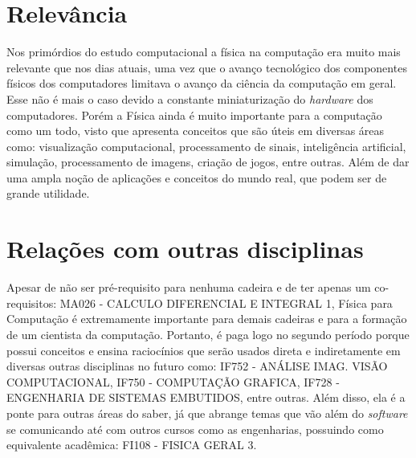 \documentclass[12pt]{article}
\begin{document}
\section{Relevância}
\par
Nos primórdios do estudo computacional a física na computação era muito mais relevante que nos dias atuais, uma vez que o avanço tecnológico dos componentes físicos dos computadores limitava o avanço da ciência da computação em geral. Esse não é mais o caso devido a constante miniaturização do \textit{hardware} dos computadores. Porém a Física ainda é muito importante para a computação como um todo, visto que apresenta conceitos que são úteis em diversas áreas como: visualização computacional, processamento de sinais, inteligência artificial, simulação, processamento de imagens, criação de jogos, entre outras. Além de dar uma ampla noção de aplicações e conceitos do mundo real, que podem ser de grande utilidade.
\cite{fonte:WIKI}
\cite{fonte:FC}

\section{Relações com outras disciplinas}
\par
Apesar de não ser pré-requisito para nenhuma cadeira e de ter apenas um co-requisitos: MA026 - CALCULO DIFERENCIAL E INTEGRAL 1, Física para Computação é extremamente importante para demais cadeiras e para a formação de um cientista da computação. Portanto, é paga logo no segundo período porque possui conceitos e ensina raciocínios que serão usados direta e indiretamente em diversas outras disciplinas no futuro como: IF752 - ANÁLISE IMAG. VISÃO COMPUTACIONAL, IF750 - COMPUTAÇÃO GRAFICA, IF728 - ENGENHARIA DE SISTEMAS EMBUTIDOS, entre outras. Além disso, ela é a ponte para outras áreas do saber, já que abrange temas que vão além do \textit{software} se comunicando até com outros cursos como as engenharias, possuindo como equivalente acadêmica: FI108 - FISICA GERAL 3.
\cite{fonte:SIGA}




\end{document}
